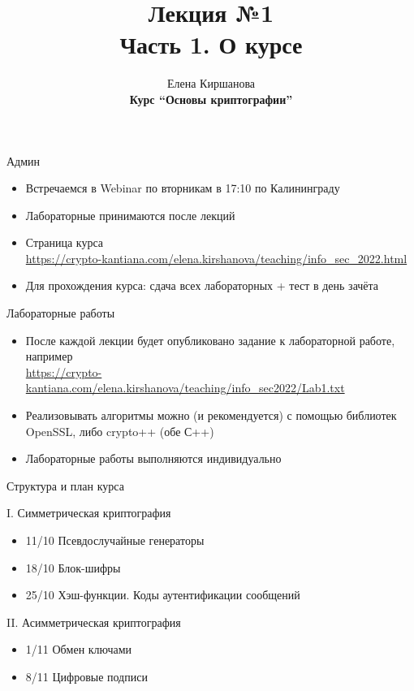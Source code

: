 \documentclass[usenames,dvipsnames,8pt,aspectratio=169]{beamer}
\title{Лекция №1 \\[10pt]
		Часть 1. О курсе}
\date{ Елена Киршанова \\  \textbf{Курс ``Основы криптографии''} \\  }
\begin{document}
	
\begin{frame}
	\titlepage
\end{frame}


\begin{frame}{Админ}
\Large
\begin{itemize}
	\itemsep 12pt
	\item Встречаемся в Webinar по вторникам в 17:10 по Калининграду
	\item Лабораторные принимаются после лекций
	\item Страница курса  \\
	\url{https://crypto-kantiana.com/elena.kirshanova/teaching/info_sec\_2022.html}
	\item Для прохождения курса: сдача всех лабораторных + тест в день зачёта
\end{itemize}
\end{frame}


\begin{frame}{Лабораторные работы}
\Large
\begin{itemize}
	\itemsep 12pt
	\item После каждой лекции будет опубликовано задание к лабораторной работе, например\\
	\url{https://crypto-kantiana.com/elena.kirshanova/teaching/info_sec2022/Lab1.txt}
	\item Реализовывать алгоритмы можно (и рекомендуется) с помощью библиотек OpenSSL, либо crypto++ (обе С++)
	\item Лабораторные работы выполняются индивидуально
\end{itemize}
\end{frame}

\begin{frame}{Структура и план курса}

\Large
{\color{Orange} I. Симметрическая криптография} \\[10pt]
\begin{itemize}
	\item 11/10 Псевдослучайные генераторы
	\item 18/10 Блок-шифры
	\item 25/10 Хэш-функции. Коды аутентификации сообщений 
\end{itemize}

\vspace{20pt}
{\color{Orange} II. Асимметрическая криптография}

\begin{itemize}
	\item 1/11 Обмен ключами
	\item 8/11 Цифровые подписи
\end{itemize}

\end{frame}
\end{document}
